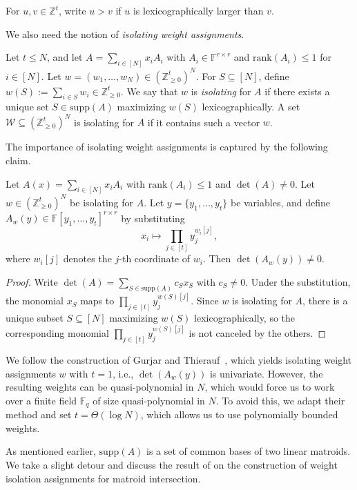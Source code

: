 \documentclass[11pt]{article}
\newcommand{\rank}{\mathrm{rank}}
\newcommand{\F}{\mathbb{F}}
\newcommand{\Z}{\mathbb{Z}}
\newcommand{\supp}{\mathrm{supp}}
\begin{document}
For $u,v\in \Z^t$, write $u>v$ if $u$ is lexicographically larger than $v$.

We also need the notion of \emph{isolating weight assignments}.

\begin{definition}
Let $t\le N$, and let $A=\sum_{i\in [N]} x_i A_i$ with $A_i\in\F^{r\times r}$ and $\rank(A_i) \leq 1$ for $i\in [N]$. 
Let $w=(w_1,\dots,w_N)\in (\Z_{\ge 0}^t)^N$. 
For $S\subseteq [N]$, define $w(S):=\sum_{i\in S} w_i \in \Z_{\geq 0}^t$.
We say that $w$ is \emph{isolating} for $A$ if there exists a unique set $S\in \supp(A)$ maximizing $w(S)$ lexicographically.
A set $\mathcal W\subseteq (\Z_{\ge 0}^t)^N$ is isolating for $A$ if it contains such a vector $w$.
\end{definition}

The importance of isolating weight assignments is captured by the following claim.

\begin{claim}\label{cl:isolationImpliesnon-zero}
Let $A(x)=\sum_{i\in [N]} x_i A_i$ with $\rank(A_i)\leq 1$ and $\det(A)\neq 0$. 
Let $w\in (\Z_{\ge 0}^t)^N$ be isolating for $A$. 
Let $y=\{y_1,\dots,y_t\}$ be variables, and define $A_w(y)\in\F[y_1,\dots,y_t]^{r\times r}$ by substituting
\[
x_i \mapsto \prod_{j\in [t]} y_j^{w_i[j]},
\]
where $w_i[j]$ denotes the $j$-th coordinate of $w_i$.
Then $\det(A_w(y))\neq 0$.
\end{claim}

\begin{proof}
Write $\det(A)=\sum_{S\in \supp(A)} c_S x_S$ with $c_S\neq 0$. 
Under the substitution, the monomial $x_S$ maps to $\prod_{j\in [t]} y_j^{w(S)[j]}$. 
Since $w$ is isolating for $A$, there is a unique subset $S\subseteq [N]$ maximizing $w(S)$ lexicographically, so the corresponding monomial $\prod_{j\in [t]} y_j^{w(S)[j]}$ is not canceled by the others.
\end{proof}

We follow the construction of Gurjar and Thierauf~\cite{DBLP:journals/cc/GurjarT20}, which yields isolating weight assignments $w$ with $t=1$, i.e.,  $\det(A_w(y))$ is univariate. However, the resulting weights can be quasi-polynomial in $N$, which would force us to work over a finite field $\F_q$ of size quasi-polynomial in $N$. 
To avoid this, we adapt their method and set $t=\Theta(\log N)$, which allows us to use polynomially bounded weights.

As mentioned earlier,  $\supp(A)$ is a set of common bases of two linear matroids. We take a slight detour and discuss the result of \cite{DBLP:journals/cc/GurjarT20} on the construction of weight isolation assignments for matroid intersection. 
\end{document}
